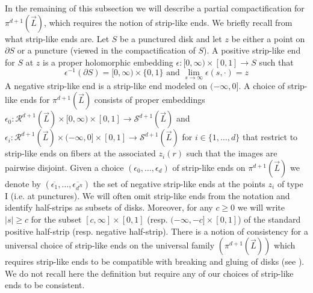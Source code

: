 In the remaining of this subsection we will describe a partial compactification for $\pi^{d+1}(\vec{L})$, which requires the notion of strip-like ends. We briefly recall from \cite{Se:book-fukaya-categ} what strip-like ends are. Let $S$ be a punctured disk and let $z$ be either a point on $\partial S$ or a puncture (viewed in the compactification of $S$). A positive strip-like\label{striplikends} end for $S$ at $z$ is a proper holomorphic embedding $\epsilon: [0,\infty)\times [0,1]\to S$ such that $$\epsilon^{-1}(\partial S)= [0,\infty)\times \{0,1\} \text{    and   }\lim_{s\to \infty}\epsilon(s,\cdot)= z$$ A negative strip-like end is a strip-like end modeled on $(-\infty,0]$.  A choice of strip-like ends for $\pi^{d+1}(\vec{L})$ consists of proper embeddings $\epsilon_0: \mathcal{R}^{d+1}(\vec{L})\times [0,\infty)\times [0,1]\to \mathcal{S}^{d+1}(\vec{L})$ and $\epsilon_i: \mathcal{R}^{d+1}(\vec{L})\times (-\infty,0]\times [0,1]\to \mathcal{S}^{d+1}(\vec{L})$ for $i\in \{1,\ldots, d\}$ that restrict to strip-like ends on fibers at the associated $z_i(r)$ such that the images are pairwise disjoint. Given a choice $(\epsilon_0,\ldots, \epsilon_d)$ of strip-like ends on $\pi^{d+1}(\vec{L})$ we denote by $(\overline{\epsilon_1}, \ldots, \overline{\epsilon_{d^R}})$ the set of negative strip-like ends at the points $z_i$ of type I (i.e. at punctures). We will often omit strip-like ends from the notation and identify half-strips as subsets of disks. Moreover, for any $c\geq 0$ we will write $|s|\geq c$ for the subset $[c,\infty]\times [0,1]$ (resp. $(-\infty,-c]\times [0,1]$) of the standard positive half-strip (resp. negative half-strip). There is a notion of consistency for a universal choice of strip-like ends on the universal family $\left(\pi^{d+1}(\vec{L})\right)$ which requires strip-like ends to be compatible with breaking and gluing of disks (see \cite[Section 9g]{Se:book-fukaya-categ}). We do not recall here the definition but require any of our choices of strip-like ends to be consistent.



